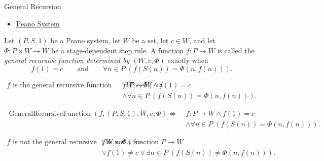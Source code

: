 \begin{topicbox}{General Recursion}
\begin{remark*}[Dependencies]
\begin{itemize}
  \item \hyperref[def:peano-system]{Peano System}
\end{itemize}
\end{remark*}

\begin{tcolorbox}[colback=defbox, colframe=defborder, arc=2pt,
  left=6pt, right=6pt, top=4pt, bottom=4pt,
  title={\small\textbf{Definition (General Recursive Function)}},
  fonttitle=\small\bfseries]
\begin{definition}
\label{def:general-recursive-function}
Let $(P,S,1)$ be a Peano system, let $W$ be a set, let $c\in W$, and let
$\Phi:P\times W\to W$ be a stage-dependent step rule. A function $f:P\to W$
is called the \emph{general recursive function determined by $(W,c,\Phi)$}
exactly when
\[
f(1)=c
\qquad\text{and}\qquad
\forall n\in P\;(f(S(n))=\Phi(n,f(n))).
\]
\end{definition}
\end{tcolorbox}

\begin{remark*}
\[
\begin{aligned}
f \text{ is the general recursive function determined by } (W,c,\Phi)
\Longleftrightarrow\;&
f:P\to W\land f(1)=c\\
&\land \forall n\in P\;(f(S(n))=\Phi(n,f(n))).
\end{aligned}
\]
\end{remark*}

\begin{remark*}
\[
\begin{aligned}
\operatorname{GeneralRecursiveFunction}(f,(P,S,1),W,c,\Phi)
\Longleftrightarrow\;&
f:P\to W\land f(1)=c\\
&\land \forall n\in P\;(f(S(n))=\Phi(n,f(n))).
\end{aligned}
\]
\end{remark*}

\begin{remark*}
\[
\begin{aligned}
f \text{ is not the general recursive function determined by } (W,c,\Phi)
\Longleftrightarrow\;&
f \text{ is not a function } P\to W\\
&\lor f(1)\neq c
\lor \exists n\in P\;(f(S(n))\neq \Phi(n,f(n))).
\end{aligned}
\]
\end{remark*}


\end{topicbox}
